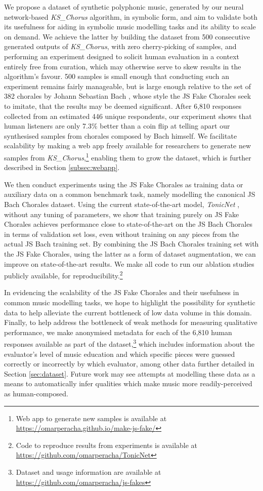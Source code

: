 \documentclass{article}
\begin{document}
We propose a dataset of synthetic polyphonic music, generated by our neural network-based \textit{KS\_Chorus} algorithm, in symbolic form, and aim to validate both its usefulness for aiding in symbolic music modelling tasks and its ability to scale on demand. We achieve the latter by building the dataset from 500 consecutive generated outputs of \textit{KS\_Chorus}, with zero cherry-picking of samples, and performing an experiment designed to solicit human evaluation in a context entirely free from curation, which may otherwise serve to skew results in the algorithm's favour. 500 samples is small enough that conducting such an experiment remains fairly manageable, but is large enough relative to the set of 382 chorales by Johann Sebastian Bach \cite{boulanger}, whose style the JS Fake Chorales seek to imitate, that the results may be deemed significant. After 6,810 responses collected from an estimated 446 unique respondents, our experiment shows that human listeners are only 7.3\% better than a coin flip at telling apart our synthesised samples from chorales composed by Bach himself. We facilitate scalability by making a web app freely available for researchers to generate new samples from \textit{KS\_Chorus},\footnote{Web app to generate new samples is available at \url{https://omarperacha.github.io/make-js-fake/}} enabling them to grow the dataset, which is further described in Section \ref{subsec:webapp}.

We then conduct experiments using the JS Fake Chorales as training data or auxiliary data on a common benchmark task, namely modelling the canonical JS Bach Chorales dataset. Using the current state-of-the-art model, \textit{TonicNet} \cite{tonicnet}, without any tuning of parameters, we show that training purely on JS Fake Chorales achieves performance close to state-of-the-art on the JS Bach Chorales in terms of validation set loss, even without training on any pieces from the actual JS Bach training set. By combining the JS Bach Chorales training set with the JS Fake Chorales, using the latter as a form of dataset augmentation, we can improve on  state-of-the-art results. We make all code to run our ablation studies publicly available, for reproducibility.\footnote{Code to reproduce results from experiments is available at \url{https://github.com/omarperacha/TonicNet}}

In evidencing the scalability of the JS Fake Chorales and their usefulness in common music modelling tasks, we hope to highlight the possibility for synthetic data to help alleviate the current bottleneck of low data volume in this domain. Finally, to help address the bottleneck of weak methods for measuring qualitative performance, we make anonymised metadata for each of the 6,810 human responses available as part of the dataset,\footnote{Dataset and usage information are available at \url{https://github.com/omarperacha/js-fakes}} which includes information about the evaluator's level of music education and which specific pieces were guessed correctly or incorrectly by which evaluator, among other data further detailed in Section \ref{sec:dataset}.  Future work may see attempts at modelling these data as a means to automatically infer qualities which make music more readily-perceived as human-composed.
\end{document}
